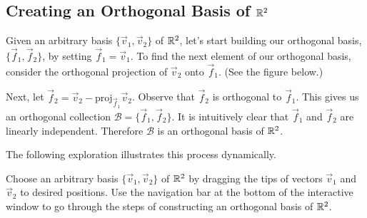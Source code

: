 \documentclass{ximera}
\begin{document}
\subsection*{Creating an Orthogonal Basis of $\mathbb{R}^2$}  
Given an arbitrary basis $\{\vec{v}_1, \vec{v}_2\}$ of $\mathbb{R}^2$, let's start building our orthogonal basis, $\{\vec{f}_1, \vec{f}_2\}$, by setting $\vec{f}_1 = \vec{v}_1$. To find the next element of our orthogonal basis, consider the orthogonal projection of $\vec{v}_2$ onto $\vec{f}_1$.  (See the figure below.)  
\begin{center}
 \quad\quad
{}
\end{center}
Next, let $\vec{f}_2=\vec{v}_2-\mbox{proj}_{\vec{f}_1}\vec{v}_2$.  Observe that $\vec{f}_2$ is orthogonal to $\vec{f}_1$.  This gives us an orthogonal collection $\mathcal{B}=\{\vec{f}_1,\vec{f}_2\}$.  It is intuitively clear that $\vec{f}_1$ and $\vec{f}_2$ are linearly independent.  Therefore $\mathcal{B}$ is an orthogonal basis of $\mathbb{R}^2$.

The following exploration illustrates this process dynamically.
\begin{exploration}
Choose an arbitrary basis $\{\vec{v}_1, \vec{v}_2\}$ of $\mathbb{R}^2$ by dragging the tips of vectors $\vec{v}_1$ and $\vec{v}_2$ to desired positions.  Use the navigation bar at the bottom of the interactive window to go through the steps of constructing an orthogonal basis of $\mathbb{R}^2$.
\begin{center}
\end{center}
\end{exploration}
\end{document}

